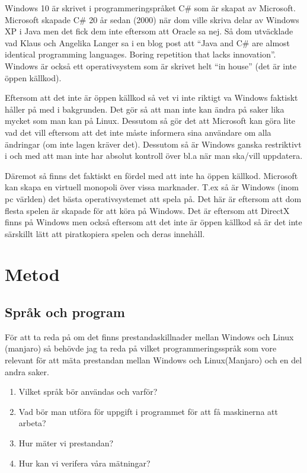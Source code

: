 \documentclass[12pt, a4paper]{report}
\begin{document}
    Windows 10 är skrivet i programmeringspråket C\# som är skapat av Microsoft\cite{c}. Microsoft skapade C\# 20 år sedan (2000) när dom ville skriva delar av Windows XP i Java men det fick dem inte eftersom att Oracle sa nej. Så dom utväcklade vad Klaus och Angelika Langer sa i en blog post att ``Java and C\# are almost identical programming languages. Boring repetition that lacks innovation''.\cite{cquote} Windows är också ett operativsystem som är skrivet helt ``in house'' (det är inte öppen källkod). 
    
    Eftersom att det inte är öppen källkod så vet vi inte riktigt va Windows faktiskt håller på med i bakgrunden. Det gör så att man inte kan ändra på saker lika mycket som man kan på Linux. Dessutom så gör det att Microsoft kan göra lite vad det vill eftersom att det inte måste informera sina användare om alla ändringar (om inte lagen kräver det). Dessutom så är Windows ganska restriktivt i och med att man inte har absolut kontroll över bl.a när man ska/vill uppdatera.
 
   Däremot så finns det faktiskt en fördel med att inte ha öppen källkod. Microsoft kan skapa en virtuell monopoli över vissa marknader. T.ex så är Windows (inom pc världen) det bästa operativsystemet att spela på. Det här är eftersom att dom flesta spelen är skapade för att köra på Windows. Det är eftersom att DirectX\cite{directx} finns på Windows men också eftersom att det inte är öppen källkod så är det inte särskillt lätt att piratkopiera spelen och deras innehåll.


 
\section{Metod}
 

\subsection{Språk och program}
 
För att ta reda på om det finns prestandaskillnader mellan Windows och Linux (manjaro) så behövde jag ta reda på vilket programmeringsspråk som vore relevant för att mäta prestandan mellan Windows och Linux(Manjaro) och en del andra saker.

\begin{enumerate}
   \item Vilket språk bör användas och varför?
   \item Vad bör man utföra för uppgift i programmet för att få maskinerna att arbeta?
   \item Hur mäter vi prestandan?
   \item Hur kan vi verifera våra mätningar?
\end{enumerate}
 
\end{document}
